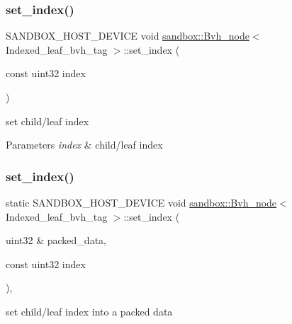 \subsubsection{\texorpdfstring{set\+\_\+index()}{set\_index()}\hspace{0.1cm}{\footnotesize\ttfamily [1/2]}}
{\footnotesize\ttfamily S\+A\+N\+D\+B\+O\+X\+\_\+\+H\+O\+S\+T\+\_\+\+D\+E\+V\+I\+CE void \hyperlink{structsandbox_1_1_bvh__node}{sandbox\+::\+Bvh\+\_\+node}$<$ Indexed\+\_\+leaf\+\_\+bvh\+\_\+tag $>$\+::set\+\_\+index (\begin{DoxyParamCaption}\item[{const uint32}]{index }\end{DoxyParamCaption})}

set child/leaf index


\begin{DoxyParams}{Parameters}
{\em index} & child/leaf index \\
\hline
\end{DoxyParams}
\mbox{\label{structsandbox_1_1_bvh__node_3_01_indexed__leaf__bvh__tag_01_4_a21ff5f7d112aebb731f30e5e44a483a2}} 
\subsubsection{\texorpdfstring{set\+\_\+index()}{set\_index()}\hspace{0.1cm}{\footnotesize\ttfamily [2/2]}}
{\footnotesize\ttfamily static S\+A\+N\+D\+B\+O\+X\+\_\+\+H\+O\+S\+T\+\_\+\+D\+E\+V\+I\+CE void \hyperlink{structsandbox_1_1_bvh__node}{sandbox\+::\+Bvh\+\_\+node}$<$ Indexed\+\_\+leaf\+\_\+bvh\+\_\+tag $>$\+::set\+\_\+index (\begin{DoxyParamCaption}\item[{uint32 \&}]{packed\+\_\+data,  }\item[{const uint32}]{index }\end{DoxyParamCaption})\hspace{0.3cm}{\ttfamily [inline]}, {\ttfamily [static]}}

set child/leaf index into a packed data


